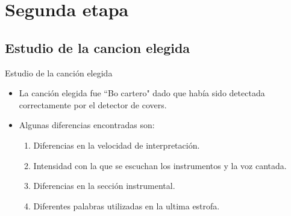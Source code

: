 \documentclass{beamer}
\begin{document}
\section{Segunda etapa}
\subsection{Estudio de la cancion elegida}
\begin{frame}{Estudio de la canción elegida}
\begin{itemize}
    \item La canción elegida fue ``Bo cartero" dado que había sido detectada correctamente por el detector de covers. 
    \item Algunas diferencias encontradas son:
    \begin{enumerate}
        \item Diferencias en la velocidad de interpretación.
        \item Intensidad con la que se escuchan los instrumentos y la voz cantada.
        \item Diferencias en la sección instrumental.
        \item Diferentes palabras utilizadas en la ultima estrofa. 
    \end{enumerate}
\end{itemize}
\end{frame}
\end{document}
